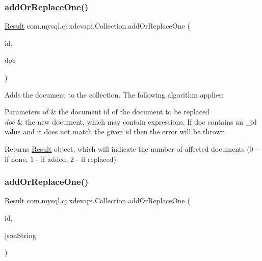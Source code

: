 \subsubsection{\texorpdfstring{add\+Or\+Replace\+One()}{addOrReplaceOne()}\hspace{0.1cm}{\footnotesize\ttfamily [1/2]}}
{\footnotesize\ttfamily \mbox{\hyperlink{interfacecom_1_1mysql_1_1cj_1_1xdevapi_1_1_result}{Result}} com.\+mysql.\+cj.\+xdevapi.\+Collection.\+add\+Or\+Replace\+One (\begin{DoxyParamCaption}\item[{String}]{id,  }\item[{\mbox{\hyperlink{interfacecom_1_1mysql_1_1cj_1_1xdevapi_1_1_db_doc}{Db\+Doc}}}]{doc }\end{DoxyParamCaption})}

Adds the document to the collection. The following algorithm applies\+:


\begin{DoxyParams}{Parameters}
{\em id} & the document id of the document to be replaced \\
\hline
{\em doc} & the new document, which may contain expressions. If doc contains an \+\_\+id value and it does not match the given id then the error will be thrown. \\
\hline
\end{DoxyParams}
\begin{DoxyReturn}{Returns}
\mbox{\hyperlink{interfacecom_1_1mysql_1_1cj_1_1xdevapi_1_1_result}{Result}} object, which will indicate the number of affected documents (0 -\/ if none, 1 -\/ if added, 2 -\/ if replaced) 
\end{DoxyReturn}
\mbox{\label{interfacecom_1_1mysql_1_1cj_1_1xdevapi_1_1_collection_adf42b24e9ac93397cdd86f485ac93919}} 
\subsubsection{\texorpdfstring{add\+Or\+Replace\+One()}{addOrReplaceOne()}\hspace{0.1cm}{\footnotesize\ttfamily [2/2]}}
{\footnotesize\ttfamily \mbox{\hyperlink{interfacecom_1_1mysql_1_1cj_1_1xdevapi_1_1_result}{Result}} com.\+mysql.\+cj.\+xdevapi.\+Collection.\+add\+Or\+Replace\+One (\begin{DoxyParamCaption}\item[{String}]{id,  }\item[{String}]{json\+String }\end{DoxyParamCaption})}

